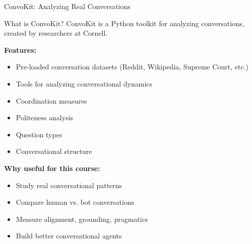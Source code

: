 \documentclass[aspectratio=169]{beamer}
\begin{document}
\begin{frame}[shrink=10]{ConvoKit: Analyzing Real Conversations 🔬}
\small
    \begin{block}{What is ConvoKit?}
        ConvoKit is a Python toolkit for analyzing conversations, created by researchers at Cornell.
    \end{block}

    \vspace{0.3cm}

    \textbf{Features:}
    \begin{itemize}\setlength{\itemsep}{0pt}
        \item Pre-loaded conversation datasets (Reddit, Wikipedia, Supreme Court, etc.)
        \item Tools for analyzing conversational dynamics
        \item Coordination measures
        \item Politeness analysis
        \item Question types
        \item Conversational structure
    \end{itemize}

    \vspace{0.3cm}

    \textbf{Why useful for this course:}
    \begin{itemize}\setlength{\itemsep}{0pt}
        \item Study real conversational patterns
        \item Compare human vs. bot conversations
        \item Measure alignment, grounding, pragmatics
        \item Build better conversational agents
    \end{itemize}
\end{frame}
\end{document}
